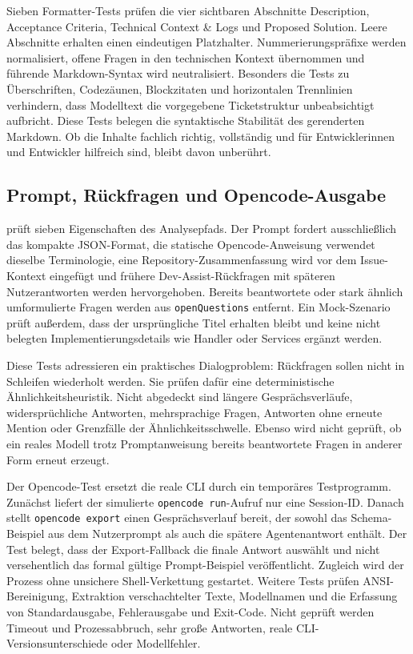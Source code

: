 Sieben Formatter-Tests prüfen die vier sichtbaren Abschnitte Description, Acceptance Criteria, Technical Context \& Logs und Proposed Solution. Leere Abschnitte erhalten einen eindeutigen Platzhalter. Nummerierungspräfixe werden normalisiert, offene Fragen in den technischen Kontext übernommen und führende Markdown-Syntax wird neutralisiert. Besonders die Tests zu Überschriften, Codezäunen, Blockzitaten und horizontalen Trennlinien verhindern, dass Modelltext die vorgegebene Ticketstruktur unbeabsichtigt aufbricht. Diese Tests belegen die syntaktische Stabilität des gerenderten Markdown. Ob die Inhalte fachlich richtig, vollständig und für Entwicklerinnen und Entwickler hilfreich sind, bleibt davon unberührt.

\subsection{Prompt, Rückfragen und Opencode-Ausgabe}

 prüft sieben Eigenschaften des Analysepfads. Der Prompt fordert ausschließlich das kompakte JSON-Format, die statische Opencode-Anweisung verwendet dieselbe Terminologie, eine Repository-Zusammenfassung wird vor dem Issue-Kontext eingefügt und frühere Dev-Assist-Rückfragen mit späteren Nutzerantworten werden hervorgehoben. Bereits beantwortete oder stark ähnlich umformulierte Fragen werden aus \texttt{openQuestions} entfernt. Ein Mock-Szenario prüft außerdem, dass der ursprüngliche Titel erhalten bleibt und keine nicht belegten Implementierungsdetails wie Handler oder Services ergänzt werden.

Diese Tests adressieren ein praktisches Dialogproblem: Rückfragen sollen nicht in Schleifen wiederholt werden. Sie prüfen dafür eine deterministische Ähnlichkeitsheuristik. Nicht abgedeckt sind längere Gesprächsverläufe, widersprüchliche Antworten, mehrsprachige Fragen, Antworten ohne erneute Mention oder Grenzfälle der Ähnlichkeitsschwelle. Ebenso wird nicht geprüft, ob ein reales Modell trotz Promptanweisung bereits beantwortete Fragen in anderer Form erneut erzeugt.

Der Opencode-Test ersetzt die reale CLI durch ein temporäres Testprogramm. Zunächst liefert der simulierte \texttt{opencode run}-Aufruf nur eine Session-ID. Danach stellt \texttt{opencode export} einen Gesprächsverlauf bereit, der sowohl das Schema-Beispiel aus dem Nutzerprompt als auch die spätere Agentenantwort enthält. Der Test belegt, dass der Export-Fallback die finale Antwort auswählt und nicht versehentlich das formal gültige Prompt-Beispiel veröffentlicht. Zugleich wird der Prozess ohne unsichere Shell-Verkettung gestartet. Weitere Tests prüfen ANSI-Bereinigung, Extraktion verschachtelter Texte, Modellnamen und die Erfassung von Standardausgabe, Fehlerausgabe und Exit-Code. Nicht geprüft werden Timeout und Prozessabbruch, sehr große Antworten, reale CLI-Versionsunterschiede oder Modellfehler.


